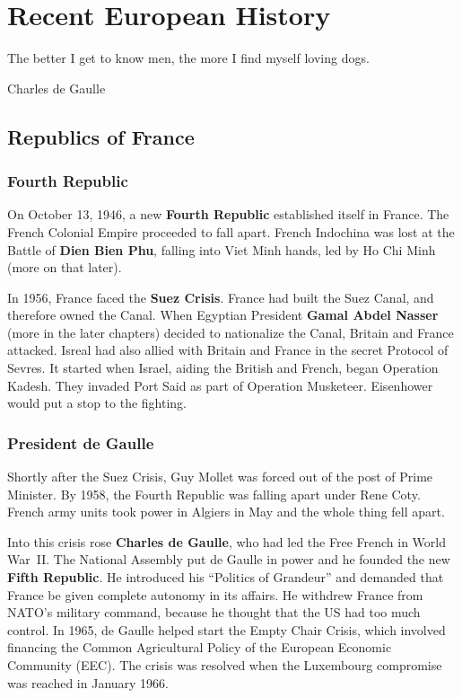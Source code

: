 \chapter{Recent European History}

\epigraph{%
  The better I get to know men, the more I find myself loving dogs.
}{Charles de Gaulle}

\section{Republics of France}

\subsection*{Fourth Republic}

On October 13, 1946, a new \textbf{Fourth Republic} established itself in France.
The French Colonial Empire proceeded to fall apart.
French Indochina was lost at the Battle of \textbf{Dien Bien Phu},
falling into Viet Minh hands, led by Ho Chi Minh (more on that later).

In 1956, France faced the \textbf{Suez Crisis}.
France had built the Suez Canal, and therefore owned the Canal.
When Egyptian President \textbf{Gamal Abdel Nasser} (more in the later chapters)
decided to nationalize the Canal, Britain and France attacked.
Isreal had also allied with Britain and France in the secret Protocol of Sevres.
It started when Israel, aiding the British and French, began Operation Kadesh.
They invaded Port Said as part of Operation Musketeer.
Eisenhower would put a stop to the fighting.

\subsection*{President de Gaulle}

Shortly after the Suez Crisis, Guy Mollet was forced out of the post of Prime Minister.
By 1958, the Fourth Republic was falling apart under Rene Coty.
French army units took power in Algiers in May and the whole thing fell apart.

Into this crisis rose \textbf{Charles de Gaulle}, who had led the Free French in World War~II\@.
The National Assembly put de Gaulle in power and he founded the new \textbf{Fifth Republic}.
He introduced his ``Politics of Grandeur''
and demanded that France be given complete autonomy in its affairs.
He withdrew France from NATO's military command,
because he thought that the US had too much control.
In 1965, de Gaulle helped start the Empty Chair Crisis,
which involved financing the Common Agricultural Policy of the European Economic Community (EEC).
The crisis was resolved when the Luxembourg compromise was reached in January 1966.

